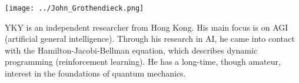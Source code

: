 \begin{minipage}{0.15\textwidth}
	\begin{center}
		\texttt{[image: ../John\_Grothendieck.png]}
	\end{center}
\end{minipage}
\begin{minipage}{0.6\textwidth}
YKY is an independent researcher from Hong Kong.  His main focus is on AGI (artificial general intelligence).  Through his research in AI, he came into contact with the Hamilton-Jacobi-Bellman equation, which describes dynamic programming (reinforcement learning).  He has a long-time, though amateur, interest in the foundations of quantum mechanics.
\end{minipage}%

\nocite{Faria2010}
\nocite{Mann2018}
\nocite{Baaquie2014}
\nocite{Gustafson2003}
\nocite{Esposito2004}
\nocite{Cook1989}
\nocite{Gosson2017}
\nocite{Liberzon2012}
\nocite{Mueller-Kirsten2006}
\nocite{Merzbacher1998}
\nocite{Hameka2004}

\printbibliography


